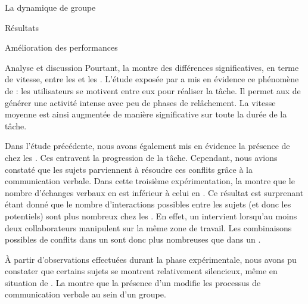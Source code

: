 \documentclass[myfrancais,ngerman,english,french]{mythesis}
\begin{document}
\begin{mychapter}{La dynamique de groupe}
\begin{mysection}{Résultats}
\begin{mysubsection}{Amélioration des performances}
\begin{mysubsubsection}{Analyse et discussion}
					Pourtant, la  montre des différences significatives, en terme de vitesse, entre les  et les .
					L'étude exposée par  a mis en évidence ce phénomène de  : les utilisateurs se motivent entre eux pour réaliser la tâche.
					Il permet aux  de générer une activité intense avec peu de phases de relâchement.
					La vitesse moyenne est ainsi augmentée de manière significative sur toute la durée de la tâche.

					Dans l'étude précédente, nous avons également mis en évidence la présence de  chez les .
					Ces  entravent la progression de la tâche.
					Cependant, nous avions constaté que les sujets parviennent à résoudre ces conflits grâce à la communication verbale.
					Dans cette troisième expérimentation, la  montre que le nombre d'échanges verbaux en  est inférieur à celui en .
					Ce résultat est surprenant étant donné que le nombre d'interactions possibles entre les sujets (et donc les  potentiels) sont plus nombreux chez les .
					En effet, un  intervient lorsqu'au moins deux collaborateurs manipulent sur la même zone de travail.
					Les combinaisons possibles de conflits dans un  sont donc plus nombreuses que dans un .

					À partir d'observations effectuées durant la phase expérimentale, nous avons pu constater que certains sujets se montrent relativement silencieux, même en situation de .
					La  montre que la présence d'un  modifie les processus de communication verbale au sein d'un groupe.


\end{mysubsubsection}
\end{mysubsection}
\end{mysection}
\end{mychapter}
\end{document}
